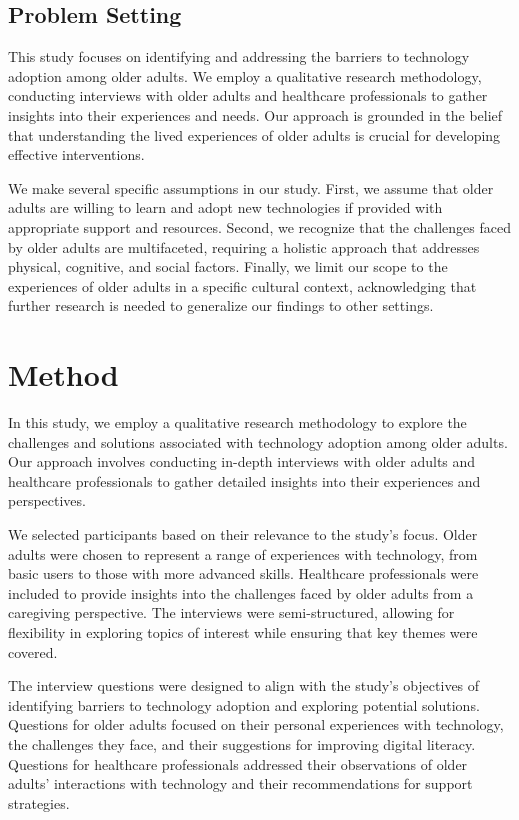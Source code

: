 \documentclass{article} %
\begin{document}
\subsection{Problem Setting}
This study focuses on identifying and addressing the barriers to technology adoption among older adults. We employ a qualitative research methodology, conducting interviews with older adults and healthcare professionals to gather insights into their experiences and needs. Our approach is grounded in the belief that understanding the lived experiences of older adults is crucial for developing effective interventions.

We make several specific assumptions in our study. First, we assume that older adults are willing to learn and adopt new technologies if provided with appropriate support and resources. Second, we recognize that the challenges faced by older adults are multifaceted, requiring a holistic approach that addresses physical, cognitive, and social factors. Finally, we limit our scope to the experiences of older adults in a specific cultural context, acknowledging that further research is needed to generalize our findings to other settings.

\section{Method}
\label{sec:method}

In this study, we employ a qualitative research methodology to explore the challenges and solutions associated with technology adoption among older adults. Our approach involves conducting in-depth interviews with older adults and healthcare professionals to gather detailed insights into their experiences and perspectives.

We selected participants based on their relevance to the study's focus. Older adults were chosen to represent a range of experiences with technology, from basic users to those with more advanced skills. Healthcare professionals were included to provide insights into the challenges faced by older adults from a caregiving perspective. The interviews were semi-structured, allowing for flexibility in exploring topics of interest while ensuring that key themes were covered.

The interview questions were designed to align with the study's objectives of identifying barriers to technology adoption and exploring potential solutions. Questions for older adults focused on their personal experiences with technology, the challenges they face, and their suggestions for improving digital literacy. Questions for healthcare professionals addressed their observations of older adults' interactions with technology and their recommendations for support strategies.
\end{document}
